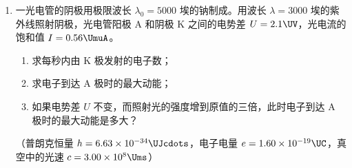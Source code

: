 \documentclass[\gkver]{gaokaozhenti}
\begin{document}
\begin{enumerate}
{已知 $T_{A}=300\UK$，设气体在 C、D 各状态下的温度分别为 $T_{C}$、$T_{D}$，又 BC 为渐近线（双曲线），故 $T_{B}=T_{C}$，由理想气体状态方程得
\[ \frac{p_{A}V_{A}}{T_{A}}=\frac{p_{B}V_{B}}{T_{B}}=\frac{p_{C}V_{C}}{T_{C}}=\frac{p_{D}V_{D}}{T_{D}}, \]
即 $\frac{4p_{0}\times10}{300}=\frac{4p_{0}\times20}{T_{B}}=\frac{2p_{0}\times40}{T_{C}}=\frac{2p_{0}\times20}{T_{D}}$，
解得 $T_{C}=T_{B}=600\UK$，$T_{D}=300\UK$。

（2）在 $V-T$ 图上状态变化过程的图线如下：


AB 是等压过程，BC 是等温过程，CD 是等压过程。

评分说明：全题 10 分。（1）3 分，（2）7 分。（1）中，每个答案，正确的给 1 分；数值错误的，给 0 分；数值正确而缺单位或单位错误的，无论在几个答案中出现，只扣 1 分。直接由 $p-V$ 图上断定 $V_{B}=20\UL$，并正确求出 $T_{B}$ 的，同样给分。（2）中，A、B、C、D 四个点，每个点正确标明的，各给 1 分；AB、BC、CD 三条图线画正确并说明是什么过程的，各给 1 分；图线画对而未说明是什么过程的，各给 0 分；在图上未画箭头或三个箭头未画全的，扣 1 分；图上两个坐标轴每有一个未注明坐标分度值的，扣 1 分。
}

\item
一光电管的阴极用极限波长 $\lambda_{0}=5000$ 埃的钠制成。用波长 $\lambda=3000$ 埃的紫外线照射阴极，光电管阳极 A 和阴极 K 之间的电势差 $U=2.1\UV$，光电流的饱和值 $I=0.56\UmuA$。
\begin{enumerate}
	\item
	求每秒内由 K 极发射的电子数；
	\item
	求电子到达 A 极时的最大动能；
	\item
	如果电势差 $U$ 不变，而照射光的强度增到原值的三倍，此时电子到达 A 极时的最大动能是多大？
\end{enumerate}

（普朗克恒量 $h=6.63\times10^{-34}\UJcdots$，电子电量 $e=1.60\times10^{-19}\UC$，真空中的光速 $c=3.00\times10^{8}\Ums$）
\end{enumerate}
\end{document}
